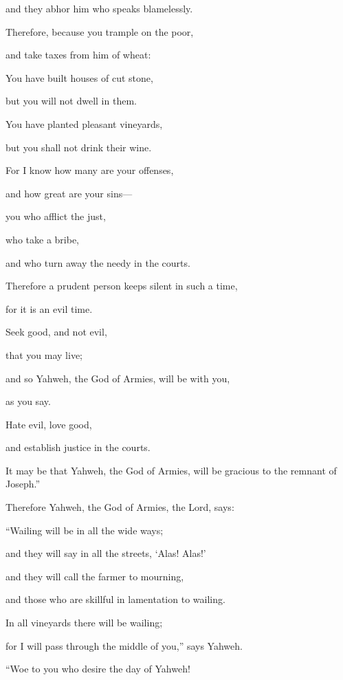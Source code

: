 {\par }{\QB and they abhor him who speaks blamelessly.
\par }{\Q {}Therefore, because you trample on the poor,
\par }{\QB and take taxes from him of wheat:
\par }{\QB You have built houses of cut stone,
\par }{\QB but you will not dwell in them.
\par }{\Q You have planted pleasant vineyards,
\par }{\QB but you shall not drink their wine.
\par }{\Q {}For I know how many are your offenses,
\par }{\QB and how great are your sins—
\par }{\QB you who afflict the just,
\par }{\QB who take a bribe,
\par }{\QB and who turn away the needy in the courts.
\par }{\Q {}Therefore a prudent person keeps silent in such a time,
\par }{\QB for it is an evil time.
\par }{\Q {}Seek good, and not evil,
\par }{\QB that you may live;
\par }{\QB and so Yahweh, the God of Armies, will be with you,
\par }{\QB as you say.
\par }{\Q {}Hate evil, love good,
\par }{\QB and establish justice in the courts.
\par }{\QB It may be that Yahweh, the God of Armies, will be gracious to the remnant of Joseph.”
\par }{\PP {}Therefore Yahweh, the God of Armies, the Lord, says:
\par }{\Q “Wailing will be in all the wide ways;
\par }{\QB and they will say in all the streets, ‘Alas! Alas!’
\par }{\QB and they will call the farmer to mourning,
\par }{\QB and those who are skillful in lamentation to wailing.
\par }{\Q {}In all vineyards there will be wailing;
\par }{\QB for I will pass through the middle of you,” says Yahweh.
\par }{\Q {}“Woe to you who desire the day of Yahweh!
}
